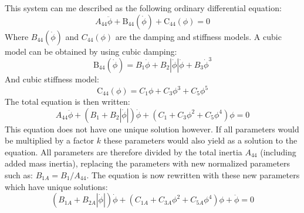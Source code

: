 This system can me described as the following ordinary differential
equation:
\begin{equation}
A_{44} \ddot{\phi} + \operatorname{B_{44}}{\left(\dot{\phi} \right)} + \operatorname{C_{44}}{\left(\phi \right)} = 0
\label{roll_decay_equation_general_himeno}
\end{equation}
Where $B_{44}(\dot{\phi})$ and $C_{44}(\phi)$ are the damping and
stiffness models. A cubic model can be obtained by using cubic damping:
\begin{equation}
\operatorname{B_{44}}{\left(\dot{\phi} \right)} = B_{1} \dot{\phi} + B_{2} \left|{\dot{\phi}}\right| \dot{\phi} + B_{3} \dot{\phi}^{3}
\label{b44_cubic_equation}
\end{equation}
And cubic stiffness model:
\begin{equation}
\operatorname{C_{44}}{\left(\phi \right)} = C_{1} \phi + C_{3} \phi^{3} + C_{5} \phi^{5}
\label{restoring_equation_cubic}
\end{equation}
The total equation is then written:
\begin{equation}
A_{44} \ddot{\phi} + \left(B_{1} + B_{2} \left|{\dot{\phi}}\right|\right) \dot{\phi} + \left(C_{1} + C_{3} \phi^{2} + C_{5} \phi^{4}\right) \phi = 0
\label{roll_decay_equation_quadratic}
\end{equation}
This equation does not have one unique solution however. If all
parameters would be multiplied by a factor $k$ these parameters would
also yield as a solution to the equation. All parameters are therefore
divided by the total inertia $A_{44}$ (including added mass inertia),
replacing the parameters with new normalized parameters such as:
$B_{1A} = B_1/A_{44}$. The equation is now rewritten with these new
parameters which have unique solutions:
\begin{equation}
\left(B_{1A} + B_{2A} \left|{\dot{\phi}}\right|\right) \dot{\phi} + \left(C_{1A} + C_{3A} \phi^{2} + C_{5A} \phi^{4}\right) \phi + \ddot{\phi} = 0
\label{roll_decay_equation_quadratic_A}
\end{equation}
